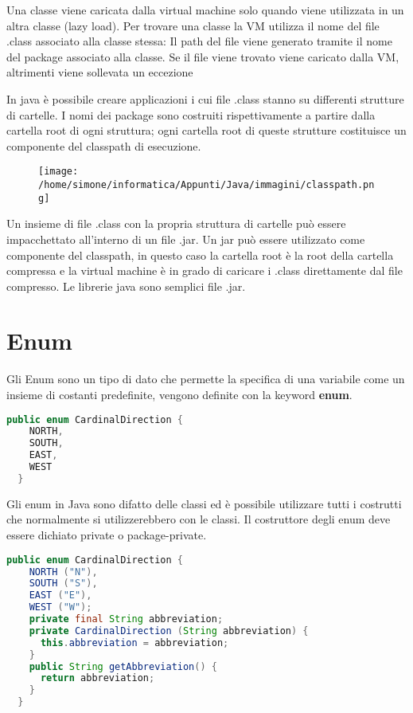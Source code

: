 \documentclass[a4paper,12pt,twoside]{book}
\begin{document}
Una classe viene caricata dalla virtual machine solo quando viene
utilizzata in un altra classe (lazy load). Per trovare una classe la
VM utilizza il nome del file .class associato alla classe stessa: Il
path del file viene generato tramite il nome del package associato
alla classe. Se il file viene trovato viene caricato dalla VM,
altrimenti viene sollevata un eccezione

In java è possibile creare applicazioni i cui file .class stanno su
differenti strutture di cartelle.  I nomi dei package sono costruiti
rispettivamente a partire dalla cartella root di ogni struttura; ogni
cartella root di queste strutture costituisce un componente del
classpath di esecuzione.


\begin{figure}
  \centering
  \texttt{[image: /home/simone/informatica/Appunti/Java/immagini/classpath.png]}
\end{figure}
\FloatBarrier
Un insieme di file .class con la propria struttura di cartelle può
essere impacchettato all'interno di un file .jar. Un jar può essere
utilizzato come componente del classpath, in questo caso la cartella
root è la root della cartella compressa e la virtual machine è in
grado di caricare i .class direttamente dal file compresso. Le
librerie java sono semplici file .jar.

\section{Enum}

Gli Enum sono un tipo di dato che permette la specifica di una
variabile come un insieme di costanti predefinite, vengono definite
con la keyword \textbf{enum}.


\begin{lstlisting}[caption={}, label={}, language=Java]
  public enum CardinalDirection {
    NORTH,
    SOUTH,
    EAST,
    WEST
  }
\end{lstlisting}


Gli enum in Java sono difatto delle classi ed è possibile utilizzare
tutti i costrutti che normalmente si utilizzerebbero con le classi. Il
costruttore degli enum deve essere dichiato private o package-private.

\begin{lstlisting}[caption={}, label={}, language=Java]
  public enum CardinalDirection {
    NORTH ("N"),
    SOUTH ("S"),
    EAST ("E"),
    WEST ("W");
    private final String abbreviation;
    private CardinalDirection (String abbreviation) {
      this.abbreviation = abbreviation;
    }
    public String getAbbreviation() {
      return abbreviation;
    }
  }
\end{lstlisting}
\end{document}
